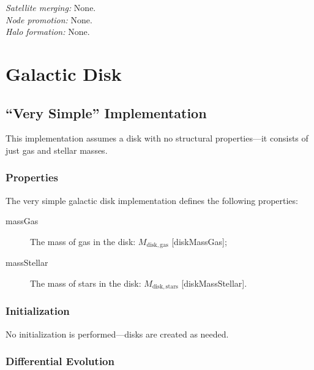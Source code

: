 \noindent\emph{Satellite merging:} None.\\

\noindent\emph{Node promotion:} None.\\ 

\noindent\emph{Halo formation:} None.\\

\section{Galactic Disk}

\subsection{``Very Simple'' Implementation}

This implementation assumes a disk with no structural properties---it consists of just gas and stellar masses.

\subsubsection{Properties}

The very simple galactic disk implementation defines the following properties:
\begin{description}
 \item [{\normalfont \ttfamily massGas}] The mass of gas in the disk: $M_\mathrm{disk, gas}$ [{\normalfont \ttfamily diskMassGas}];
 \item [{\normalfont \ttfamily massStellar}] The mass of stars in the disk: $M_\mathrm{disk, stars}$ [{\normalfont \ttfamily diskMassStellar}].
\end{description}

\subsubsection{Initialization}

No initialization is performed---disks are created as needed.

\subsubsection{Differential Evolution}

